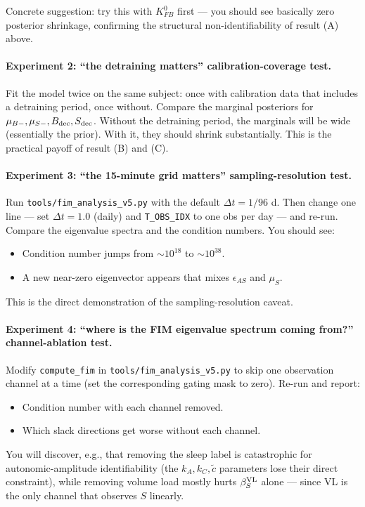 Concrete suggestion: try this with $K_{FB}^0$ first --- you should see basically zero posterior shrinkage, confirming the structural non-identifiability of result (A) above.

\paragraph{Experiment 2: ``the detraining matters'' calibration-coverage test.}
Fit the model twice on the same subject: once with calibration data that includes a detraining period, once without. Compare the marginal posteriors for $\mu_{B-}, \mu_{S-}, B_{\rm dec}, S_{\rm dec}$. Without the detraining period, the marginals will be wide (essentially the prior). With it, they should shrink substantially. This is the practical payoff of result (B) and (C).

\paragraph{Experiment 3: ``the 15-minute grid matters'' sampling-resolution test.}
Run \texttt{tools/fim\_analysis\_v5.py} with the default $\Delta t = 1/96$ d. Then change one line --- set $\Delta t = 1.0$ (daily) and \texttt{T\_OBS\_IDX} to one obs per day --- and re-run. Compare the eigenvalue spectra and the condition numbers. You should see:
\begin{itemize}
  \item Condition number jumps from $\sim 10^{18}$ to $\sim 10^{38}$.
  \item A new near-zero eigenvector appears that mixes $\epsilon_{AS}$ and $\mu_S$.
\end{itemize}
This is the direct demonstration of the sampling-resolution caveat.

\paragraph{Experiment 4: ``where is the FIM eigenvalue spectrum coming from?'' channel-ablation test.}
Modify \texttt{compute\_fim} in \texttt{tools/fim\_analysis\_v5.py} to skip one observation channel at a time (set the corresponding gating mask to zero). Re-run and report:
\begin{itemize}
  \item Condition number with each channel removed.
  \item Which slack directions get worse without each channel.
\end{itemize}
You will discover, e.g., that removing the sleep label is catastrophic for autonomic-amplitude identifiability (the $k_A, k_C, \tilde c$ parameters lose their direct constraint), while removing volume load mostly hurts $\beta_S^{\rm VL}$ alone --- since VL is the only channel that observes $S$ linearly.

